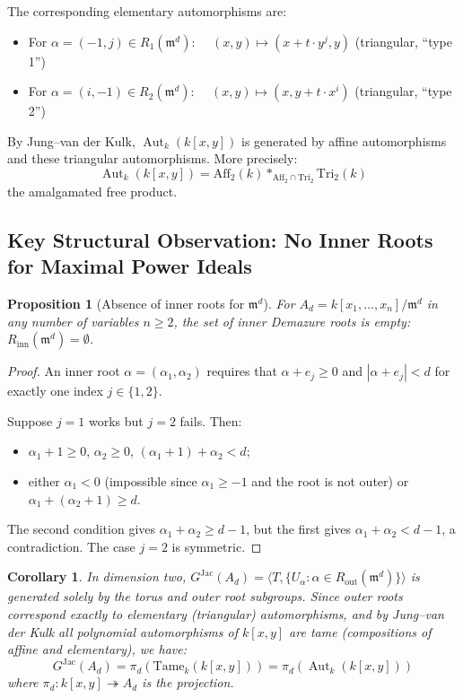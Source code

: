 \documentclass[12pt,a4paper]{article}
\newtheorem{proposition}[theorem]{Proposition}
\newtheorem{corollary}[theorem]{Corollary}
\theoremstyle{definition}
\newcommand{\kk}{k}
\newcommand{\pp}{\mathfrak{m}}
\newcommand{\Aut}{\operatorname{Aut}}
\newcommand{\GJac}{G^{\mathrm{Jac}}}
\begin{document}
The corresponding elementary automorphisms are:
\begin{itemize}
\item For $\alpha = (-1, j) \in R_1(\pp^d)$: $\quad (x,y) \mapsto (x + t \cdot y^j, y)$
  (triangular, ``type 1'')
\item For $\alpha = (i, -1) \in R_2(\pp^d)$: $\quad (x,y) \mapsto (x, y + t \cdot x^i)$
  (triangular, ``type 2'')
\end{itemize}

By Jung--van der Kulk, $\Aut_\kk(\kk[x,y])$ is generated by affine automorphisms and
these triangular automorphisms. More precisely:
\[
  \Aut_\kk(\kk[x,y]) = \mathrm{Aff}_2(\kk) *_{\mathrm{Aff}_2 \cap \mathrm{Tri}_2}
    \mathrm{Tri}_2(\kk)
\]
the amalgamated free product.

\subsection{Key Structural Observation: No Inner Roots for Maximal Power Ideals}

\begin{proposition}[Absence of inner roots for $\pp^d$]
For $A_d = \kk[x_1,\ldots,x_n]/\pp^d$ in \emph{any} number of variables $n \geq 2$,
the set of inner Demazure roots is empty:
$R_{\mathrm{inn}}(\pp^d) = \emptyset$.
\end{proposition}

\begin{proof}
An inner root $\alpha = (\alpha_1, \alpha_2)$ requires that $\alpha + e_j \geq 0$ and
$|\alpha + e_j| < d$ for exactly one index $j \in \{1,2\}$.

Suppose $j = 1$ works but $j = 2$ fails. Then:
\begin{itemize}
\item $\alpha_1 + 1 \geq 0$, $\alpha_2 \geq 0$, $(\alpha_1 + 1) + \alpha_2 < d$;
\item either $\alpha_1 < 0$ (impossible since $\alpha_1 \geq -1$ and the root is not outer)
  or $\alpha_1 + (\alpha_2 + 1) \geq d$.
\end{itemize}
The second condition gives $\alpha_1 + \alpha_2 \geq d - 1$, but the first gives
$\alpha_1 + \alpha_2 < d - 1$, a contradiction. The case $j = 2$ is symmetric.
\end{proof}

\begin{corollary}\label{cor:gjac-tame}
In dimension two, $\GJac(A_d) = \langle T, \{U_\alpha : \alpha \in R_{\mathrm{out}}(\pp^d)\}\rangle$
is generated \emph{solely} by the torus and outer root subgroups. Since outer roots correspond
exactly to elementary (triangular) automorphisms, and by Jung--van der Kulk all polynomial
automorphisms of $\kk[x,y]$ are tame (compositions of affine and elementary), we have:
\[
  \GJac(A_d) = \pi_d(\mathrm{Tame}_\kk(\kk[x,y])) = \pi_d(\Aut_\kk(\kk[x,y]))
\]
where $\pi_d: \kk[x,y] \twoheadrightarrow A_d$ is the projection.
\end{corollary}
\end{document}
